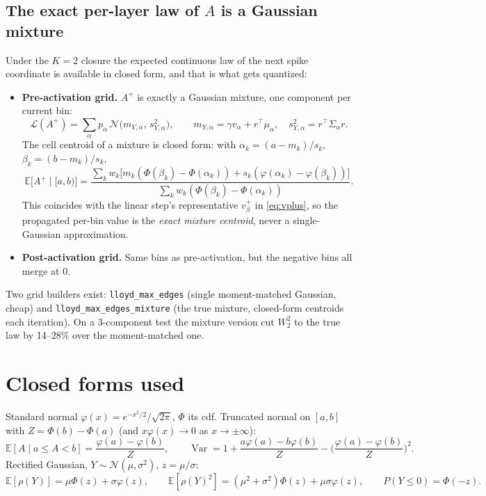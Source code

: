 \documentclass[11pt]{article}
\newcommand{\E}{\mathbb{E}}
\newcommand{\Var}{\operatorname{Var}}
\newcommand{\law}{\mathcal{L}}
\newcommand{\N}{\mathcal{N}}
\newcommand{\relu}{\rho}
\begin{document}
\subsection{The exact per-layer law of $A$ is a Gaussian mixture}
Under the $K=2$ closure the expected continuous law of the next spike coordinate is available in closed form, and that is what gets quantized:
\begin{itemize}
\item \textbf{Pre-activation grid.} $A^+$ is exactly a Gaussian mixture, one component per current bin:
\[
\law(A^+) = \sum_\alpha p_\alpha\, \N\big( m_{Y,\alpha},\, s_{Y,\alpha}^2 \big),
\qquad m_{Y,\alpha} = \gamma v_\alpha + r^\top \mu_\alpha, \quad s_{Y,\alpha}^2 = r^\top \Sigma_\alpha r.
\]
The cell centroid of a mixture is closed form: with $\alpha_k = (a - m_k)/s_k$, $\beta_k = (b - m_k)/s_k$,
\[
\E\big[A^+ \mid [a, b)\big]
= \frac{\sum_k w_k \big[ m_k (\Phi(\beta_k) - \Phi(\alpha_k)) + s_k (\varphi(\alpha_k) - \varphi(\beta_k)) \big]}
       {\sum_k w_k (\Phi(\beta_k) - \Phi(\alpha_k))}.
\]
This coincides with the linear step's representative $v^+_\beta$ in \eqref{eq:vplus}, so the propagated per-bin value is the \emph{exact mixture centroid}, never a single-Gaussian approximation.
\item \textbf{Post-activation grid.} Same bins as pre-activation, but the negative bins all merge at $0$.
\end{itemize}
Two grid builders exist: \texttt{lloyd\_max\_edges} (single moment-matched Gaussian, cheap) and \texttt{lloyd\_max\_edges\_mixture} (the true mixture, closed-form centroids each iteration). On a 3-component test the mixture version cut $W_2^2$ to the true law by 14--28\% over the moment-matched one.

\appendix
\section{Closed forms used}

Standard normal $\varphi(x) = e^{-x^2/2} / \sqrt{2\pi}$, $\Phi$ its cdf. Truncated normal on $[a, b]$ with $Z = \Phi(b) - \Phi(a)$ (and $x \varphi(x) \to 0$ as $x \to \pm\infty$):
\[
\E[A \mid a \le A < b] = \frac{\varphi(a) - \varphi(b)}{Z}, \qquad
\Var = 1 + \frac{a\varphi(a) - b\varphi(b)}{Z} - \Big( \frac{\varphi(a) - \varphi(b)}{Z} \Big)^2 .
\]
Rectified Gaussian, $Y \sim \N(\mu, \sigma^2)$, $z = \mu/\sigma$:
\[
\E[\relu(Y)] = \mu \Phi(z) + \sigma \varphi(z), \qquad
\E[\relu(Y)^2] = (\mu^2 + \sigma^2)\Phi(z) + \mu\sigma\varphi(z), \qquad
P(Y \le 0) = \Phi(-z).
\]
\end{document}
